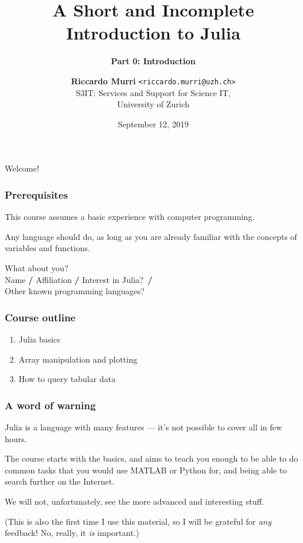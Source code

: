 \documentclass[english,serif,mathserif,xcolor=pdftex,dvipsnames,table]{beamer}
\title[Getting started]{%
  A Short and Incomplete Introduction to Julia
}
\subtitle{\bfseries Part 0: Introduction}
\author[R.~Murri]{%
  \textbf{Riccardo Murri} \texttt{<riccardo.murri@uzh.ch>}
  \\
  S3IT: Services and Support for Science IT,
  \\
  University of Zurich
}
\date{September 12, 2019}
\begin{document}
\maketitle

\begin{frame}
  \begin{center}
    {\Huge Welcome!}
  \end{center}
\end{frame}


\begin{frame}
  \frametitle{Prerequisites}
  This course assumes a basic experience with computer programming.

  \+
  Any language should do, as long as you are already familiar with
  the concepts of variables and functions.
\end{frame}


\begin{frame}
  \begin{center}
    {\Huge What about you?}
    \\ \+ \+
    \small
    Name \textbf{/}
    Affiliation \textbf{/}
    Interest in Julia?~\textbf{/}
    \\
    Other known programming languages?
  \end{center}
\end{frame}


\begin{frame}
  \frametitle{Course outline}
  \begin{enumerate}
  \item Julia basics
  \item Array manipulation and plotting
  \item How to query tabular data
  \end{enumerate}
\end{frame}


\begin{frame}
  \frametitle{A word of warning}
  Julia is a language with many features --- it's not possible to
  cover all in few hours.

  \+ The course starts with the basics, and aims to teach you enough
  to be able to do common tasks that you would use MATLAB or Python
  for, and being able to search further on the Internet.

  \+ We will not,
  unfortunately, see the more advanced and interesting stuff.

  \+ (This is also the first time I use this material, so I will be
  grateful for \emph{any} feedback!  No, really, it \emph{is}
  important.)
\end{frame}
\end{document}
